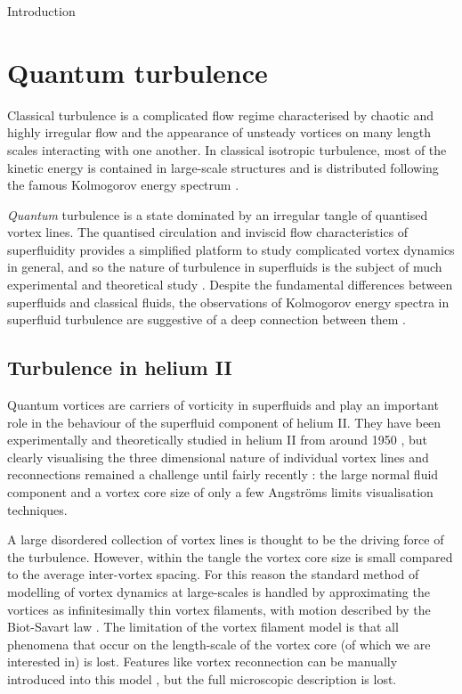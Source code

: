 \begin{chapter}{\label{cha:bose_gases}Introduction}
\section{Quantum turbulence}
Classical turbulence is a complicated flow regime characterised by chaotic and highly irregular flow and the appearance of unsteady vortices on many length scales interacting with one another. In classical isotropic turbulence, most of the kinetic energy is contained in large-scale structures and is distributed following the famous Kolmogorov energy spectrum \cite{davidson2004turbulence}.

{\it Quantum} turbulence is a state dominated by an irregular tangle of quantised vortex lines. The quantised circulation and inviscid flow characteristics of superfluidity provides a simplified platform to study complicated vortex dynamics in general, and so the nature of turbulence in superfluids is the subject of much experimental and theoretical study \cite{Bradley11,skebek12,PhysRevLett.110.014502,barenghi_skrbek_14,PhysRevLett.115.155303}. Despite the fundamental differences between superfluids and classical fluids, the observations of Kolmogorov energy spectra in superfluid turbulence are suggestive of a deep connection between them \cite{barenghi_skrbek_14}. 

\subsection{Turbulence in helium II}
Quantum vortices are carriers of vorticity in superfluids and play an important role in the behaviour of the superfluid component of helium II. They have been experimentally and theoretically studied in helium II from around 1950 \cite{Donnelly}, but clearly visualising the three dimensional nature of individual vortex lines and reconnections remained a challenge until fairly recently \cite{Bewley09,Fonda12}: the large normal fluid component and a vortex core size of only a few Angstr\"oms limits visualisation techniques.

A large disordered collection of vortex lines is thought to be the driving force of the turbulence. However, within the tangle the vortex core size is small compared to the average inter-vortex spacing. For this reason the standard method of modelling of vortex dynamics at large-scales is handled by approximating the vortices as infinitesimally thin vortex filaments, with motion described by the Biot-Savart law \cite{barenghi_donnelly_01}. The limitation of the vortex filament model is that all phenomena that occur on the length-scale of the vortex core (of which we are interested in) is lost. Features like vortex reconnection can be manually introduced into this model \cite{barenghi_donnelly_01}, but the full microscopic description is lost.


\end{chapter}
